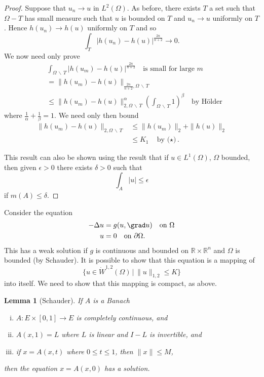 \documentclass[10pt, oneside, reqno]{amsart}
\theoremstyle{plain}%
\newtheorem{lem}[thm]{Lemma}
\numberwithin{equation}{section}
\theoremstyle{definition}
\theoremstyle{remark}
\newcommand{\given}{ \, | \,}
\newcommand{\R}{\mathbb{R}}
\begin{document}
\begin{proof}
    Suppose that $u_n \rightarrow u$ in $L^2(\Omega)$.  As before, there exists $T$ a set such that $\Omega - T$ has small measure such that $u$ is bounded on $T$ and $u_n \rightarrow u$ uniformly on $T$.  Hence $h(u_n) \rightarrow h(u)$ uniformly on $T$ and so \[
        \int_T \left| h(u_n) - h(u) \right|^{\frac{2n}{n+2}} \rightarrow 0.
    \]  We now need only prove \begin{align*}
        &\int_{\Omega \, \backslash \, T} \left| h(u_m) - h(u) \right|^{\frac{2n}{n+2}} \quad \text{is small for large $m$} \\
        &= \| h(u_m) - h(u) \|_{\frac{2n}{n+2}, \Omega \, \backslash \, T} \\
        &\leq \| h(u_m) - h(u) \|_{2, \Omega \, \backslash \, T}^\alpha \left( \int_{\Omega \, \backslash \, T} 1 \right)^\beta \quad \text{by H\"older}
    \end{align*} where $\frac{1}{\alpha} + \frac{1}{\beta} = 1$.  We need only then bound \begin{align*}
        \| h(u_m) - h(u) \|_{2, \Omega \, \backslash \, T} &\leq \| h(u_m)\|_2  + \| h(u) \|_2 \\
        &\leq K_1 \quad \text{by ($\star$)}.
        \end{align*}
        
        This result can also be shown using the result that if $u \in L^1(\Omega)$, $\Omega$ bounded, then given $\epsilon > 0$ there exists $\delta > 0$ such that \[
            \int_A | u | \leq \epsilon
        \] if $m(A) \leq \delta$.
\end{proof}

Consider the equation \begin{align*}
    -\Delta u &= g(u, \grad u) \quad \text{on $\Omega$} \\
        u &= 0 \quad \text{on $\partial \Omega$.}
\end{align*}  This has a weak solution if $g$ is continuous and bounded on $\R \times \R^n$ and $\Omega$ is bounded (by Schauder).  It is possible to show that this equation is a mapping of \[
    \{ u \in \dot W^{1, 2}(\Omega) \given \| u \|_{1, 2} \leq K \}
\] into itself.  We need to show that this mapping is compact, as above. 

\begin{lem}[Schauder]
    If $A$ is a Banach \begin{enumerate}[(i)]
        \item $A: E \times [0, 1] \rightarrow E$ is completely continuous, and 
        \item $A(x, 1) = L$ where $L$ is linear and $I - L$ is invertible, and 
        \item if $x = A(x, t)$ where $0 \leq t \leq 1$, then $\| x \| \leq M$,
    \end{enumerate}
    then the equation $x = A(x, 0)$ has a solution.
\end{lem} 
\end{document}
